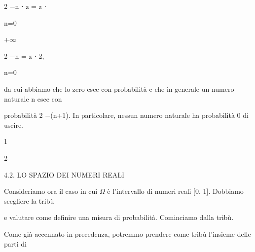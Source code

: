 \documentclass[a4paper,portrait,12pt]{article}
\begin{document}
\begin{flushleft}
2 $-$n ⋅ z = z ⋅
\end{flushleft}





\begin{flushleft}
n=0
\end{flushleft}





+$\infty$





\begin{flushleft}
2 $-$n = z ⋅ 2,
\end{flushleft}





\begin{flushleft}
n=0
\end{flushleft}





\begin{flushleft}
da cui abbiamo che lo zero esce con probabilit\`{a} e che in generale un numero naturale n esce con
\end{flushleft}


\begin{flushleft}
probabilit\`{a} 2 $-$(n+1). In particolare, nessun numero naturale ha probabilit\`{a} 0 di uscire.
\end{flushleft}


1


2





\begin{flushleft}
4.2. LO SPAZIO DEI NUMERI REALI
\end{flushleft}


\begin{flushleft}
Consideriamo ora il caso in cui $\Omega$ \`{e} l'intervallo di numeri reali [0, 1]. Dobbiamo scegliere la tribù
\end{flushleft}


\begin{flushleft}
e valutare come definire una misura di probabilit\`{a}. Cominciamo dalla tribù.
\end{flushleft}


\begin{flushleft}
Come gi\`{a} accennato in precedenza, potremmo prendere come tribù l'insieme delle parti di
\end{flushleft}
\end{document}
